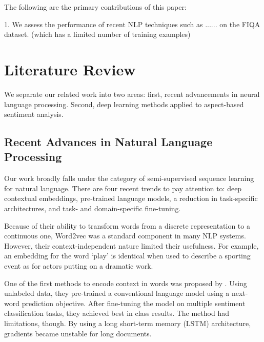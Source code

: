 \documentclass[11pt,a4paper,titlepage]{article}
\begin{document}



The following are the primary contributions of this paper:

1. We assess the performance of recent NLP techniques such as ...... on the FIQA dataset. (which has a limited number of training examples)


\section{Literature Review}

We separate our related work into two areas: first, recent advancements in neural language processing. Second, deep learning methods applied to aspect-based sentiment analysis.

\subsection{Recent Advances in Natural Language Processing}




Our work broadly falls under the category of semi-supervised sequence learning for natural language. There are four recent trends to pay attention to: deep contextual embeddings, pre-trained language models, a reduction in task-specific architectures, and task- and domain-specific fine-tuning.

Because of their ability to transform words from a discrete representation to a continuous one, Word2vec \citep{mikolov2013efficient} was a standard component in many NLP systems. However, their context-independent nature limited their usefulness. For example, an embedding for the word ‘play’ is identical when used to describe a sporting event as for actors putting on a dramatic work.

One of the first methods to encode context in words was proposed by \cite{dai2015semisupervised}. Using unlabeled data, they pre-trained a conventional language model using a next-word prediction objective. After fine-tuning the model on multiple sentiment classification tasks, they achieved best in class results. The method had limitations, though. By using a long short-term memory (LSTM) architecture, gradients became unstable for long documents.
\end{document}
